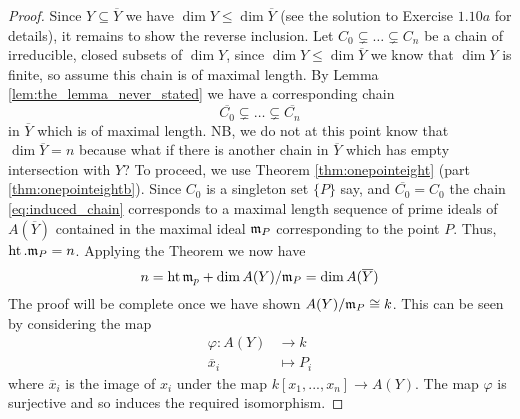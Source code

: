 \documentclass[12pt]{article}
\theoremstyle{plain}
\theoremstyle{definition}
\newcommand{\lto}{\longrightarrow}
\begin{document}
\begin{proof}
Since $Y \subseteq \overline{Y}$ we have $\operatorname{dim}Y \leq \operatorname{dim}\overline{Y}$ (see the solution to Exercise $1.10a$ \cite{hartshorne_solutions} for details), it remains to show the reverse inclusion. Let $C_0 \subsetneq \hdots \subsetneq C_n$ be a chain of irreducible, closed subsets of $\operatorname{dim}Y$, since $\operatorname{dim}Y \leq \operatorname{dim}\overline{Y}$ we know that $\operatorname{dim}Y$ is finite, so assume this chain is of maximal length. By Lemma \ref{lem:the_lemma_never_stated} we have a corresponding chain
\begin{equation}\label{eq:induced_chain}
\overline{C_0} \subsetneq \hdots \subsetneq \overline{C_n}    
\end{equation}
in $\overline{Y}$ which is of maximal length. NB, we do not at this point know that $\operatorname{dim}\overline{Y} = n$ because what if there is another chain in $\overline{Y}$ which has empty intersection with $Y$? To proceed, we use Theorem \ref{thm:onepointeight} (part \ref{thm:onepointeightb}). Since $C_0$ is a singleton set $\lbrace P\rbrace$ say, and $\overline{C_0} = C_0$ the chain \eqref{eq:induced_chain} corresponds to a maximal length sequence of prime ideals of $A(\overline{Y})$ contained in the maximal ideal $\frak{m}_P$ corresponding to the point $P$. Thus, $\operatorname{ht}.\frak{m}_P = n$. Applying the Theorem we now have
\begin{equation}
    n = \operatorname{ht}\frak{m}_p + \operatorname{dim}A(Y)/\frak{m}_P = \operatorname{dim}A(\overline{Y}) 
\end{equation}
The proof will be complete once we have shown $A(Y)/\frak{m}_P \cong k$. This can be seen by considering the map
\begin{align}
    \varphi: A(Y) &\lto k\\
    \overline{x}_i &\longmapsto P_i
\end{align}
where $\overline{x}_i$ is the image of $x_i$ under the map $k[x_1,...,x_n] \lto A(Y)$. The map $\varphi$ is surjective and so induces the required isomorphism.
\end{proof}
\end{document}
